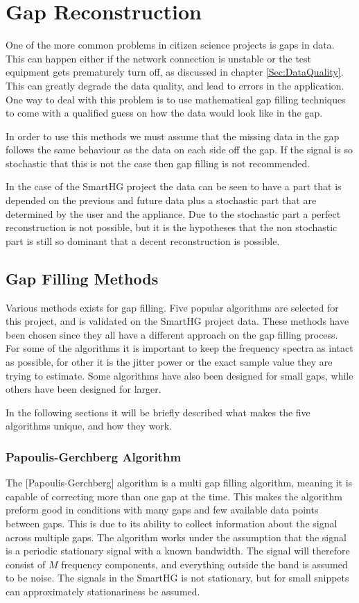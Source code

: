 \chapter{Gap Reconstruction}
\label{Sec:GapFill}
One of the more common problems in citizen science projects is gaps in data. This can happen either if the network connection is unstable or the test equipment gets prematurely turn off, as discussed in chapter \ref{Sec:DataQuality}. This can greatly degrade the data quality, and lead to errors in the application. One way to deal with this problem is to use mathematical gap filling techniques to come with a qualified guess on how the data would look like in the gap. 

In order to use this methods we must assume that the missing data in the gap follows the same behaviour as the data on each side off the gap. If the signal is so stochastic that this is not the case then gap filling is not recommended\citep{RefWorks:10}. 

In the case of the SmartHG project the data can be seen to have a part that is depended on the previous and future data plus a stochastic part that are determined by the user and the appliance. Due to the stochastic part a perfect reconstruction is not possible, but it is the hypotheses that the non stochastic part is still so dominant that a decent reconstruction is possible. 

\section{Gap Filling Methods}
\label{T:GapFilling}
Various methods exists for gap filling. Five popular algorithms are selected for this project, and is validated on the SmartHG project data. These methods have been chosen since they all have a different approach on the gap filling process. For some of the algorithms it is important to keep the frequency spectra as intact as possible, for other it is the jitter power or the exact sample value they are trying to estimate. Some algorithms have also been designed for small gaps, while others have been designed for larger. 

In the following sections it will be briefly described what makes the five algorithms unique, and how they work. 

\subsection{Papoulis-Gerchberg Algorithm}
\label{T:PGA}
The [Papoulis-Gerchberg] algorithm is a multi gap filling algorithm, meaning it is capable of correcting more than one gap at the time. This makes the algorithm preform good in conditions with many gaps and few available data points between gaps. This is due to its ability to collect information about the signal across multiple gaps\citep{RefWorks:11}. The  algorithm works under the assumption that the signal is a periodic stationary signal with a known bandwidth. The signal will therefore consist of $M$ frequency components, and everything outside the band is assumed to be noise. The signals in the SmartHG is not stationary, but for small snippets can approximately stationariness be assumed. 

